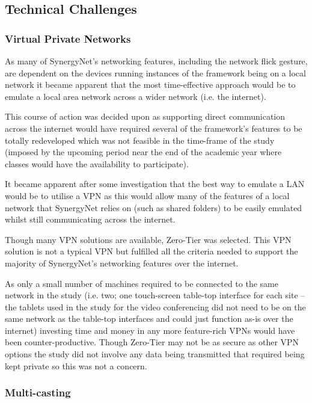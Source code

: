 \documentclass[a4paper,11pt]{article}
\begin{document}
\subsection{Technical Challenges}


\subsubsection{Virtual Private Networks}

As many of SynergyNet’s networking features, including the network flick gesture, are dependent on the devices running instances of the framework being on a local network it became apparent that the most time-effective approach would be to emulate a local area network across a wider network (i.e. the internet).

This course of action was decided upon as supporting direct communication across the internet would have required several of the framework’s features to be totally redeveloped which was not feasible in the time-frame of the study (imposed by the upcoming period near the end of the academic year where classes would have the availability to participate).

It became apparent after some investigation that the best way to emulate a LAN would be to utilise a VPN as this would allow many of the features of a local network that SynergyNet relies on (such as shared folders) to be easily emulated whilst still communicating across the internet.

Though many VPN solutions are available, Zero-Tier was selected. %
This VPN solution is not a typical VPN but fulfilled all the criteria needed to support the majority of SynergyNet’s networking features over the internet.

As only a small number of machines required to be connected to the same network in the study (i.e.
two; one touch-screen table-top interface for each site – the tablets used in the study for the video conferencing did not need to be on the same network as the table-top interfaces and could just function as-is over the internet) investing time and money in any more feature-rich VPNs would have been counter-productive.
Though Zero-Tier may not be as secure as other VPN options the study did not involve any data being transmitted that required being kept private so this was not a concern.

\subsubsection{Multi-casting}
\end{document}
